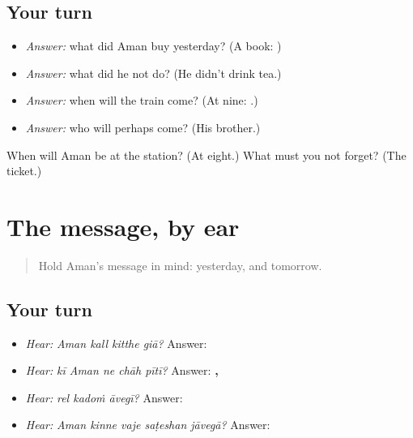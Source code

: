 \subsection*{Your turn}
\begin{itemize}
\raggedright
  \item \emph{Answer:} what did Aman buy yesterday? (A book: \textbf{   })
  \item \emph{Answer:} what did he not do? (He didn't drink tea.)
  \item \emph{Answer:} when will the train come? (At nine: \textbf{ }.)
  \item \emph{Answer:} who will perhaps come? (His brother.)
\end{itemize}

\begin{tcolorbox}[breakable,colback=teal!4,colframe=teal!35!black,title={Before you move on}]
When will Aman be at the station? (At eight.) What must you not forget? (The ticket.)
\end{tcolorbox}
\section[\texorpdfstring{\pa{ਰੇਲ} \pa{ਕਦੋਂ} \pa{ਆਵੇਗੀ}? (rel kadoṁ āvegī?)}{ਰੇਲ ਕਦੋਂ ਆਵੇਗੀ? (rel kadoṁ āvegī?)}]{The message, by ear}

\label{lesson:PA-C224-message-questions}



\begin{quote}
Hold Aman's message in mind: yesterday, and tomorrow.
\end{quote}

\subsection*{Your turn}
\begin{itemize}
\raggedright
  \item \emph{Hear:} \emph{Aman kall kitthe giā?} Answer: \textbf{  }
  \item \emph{Hear:} \emph{kī Aman ne chāh pītī?} Answer: \textbf{ ,     }
  \item \emph{Hear:} \emph{rel kadoṁ āvegī?} Answer: \textbf{   }
  \item \emph{Hear:} \emph{Aman kinne vaje saṭeshan jāvegā?} Answer: \textbf{ }
\end{itemize}

